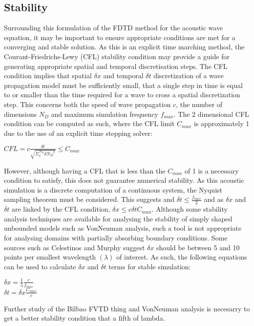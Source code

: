 \subsection{Stability}
Surrounding this formulation of the FDTD method for the acoustic wave equation, it may be important to ensure appropriate conditions are met for a converging and stable solution. As this is an explicit time marching method, the Courant-Friedrichs-Lewy (CFL) stability condition may provide a guide for generating appropriate spatial and temporal discretisation steps. The CFL condition implies that spatial $\delta x$ and temporal $\delta t$ discretization of a wave propagation model must be sufficiently small, that a single step in time is equal to or smaller than the time required for a wave to cross a spatial discretization step. This concerns both the speed of wave propagation $c$, the number of dimensions $N_D$ and maximum simulation frequency $f_{max}$. The 2 dimensional CFL condition can be computed as such, where the CFL limit $C_{max}$ is approximately 1 due to the use of an explicit time stepping solver:\\
\begin{center}
$ CFL = c \frac{\delta t}{\sqrt{\Sigma_{1}^{N_D} \delta {N_{D}}^2}} \leq C_{max}$\\
\end{center}
However, although having a CFL that is less than the $C_{max}$ of 1 is a necessary condition to satisfy, this does not guarantee numerical stability. As this acoustic simulation is a discrete computation of a continuous system, the Nyquist sampling theorem must be considered. This suggests and $\delta t \leq \frac{f_{max}}{2}$ and as $\delta x$ and $\delta t$ are linked by the CFL condition, $\delta x \leq c \delta t C_{max} $. Although some stability analysis techniques are available  for analysing the stability of simply shaped unbounded models such as VonNeuman analysis, such a tool is not appropriate for analysing domains with partially absorbing boundary conditions. Some sources such as Celestinos and Murphy suggest $\delta x$ should be between 5 and 10 points per smallest wavelength $(\lambda)$ of interest. As such, the following equations can  be used to calculate $\delta x$ and $\delta t$ terms for stable simulation:\\
\begin{center}
$\delta x = \frac{1}{5} \frac{c}{f_{max}}$\\
$\delta t = \delta x \frac{C_{max}}{c} $\\
\end{center}
Further study of the Bilbao FVTD thing and VonNeuman analysis is necesarry to get a better stability condition that a fifth of lambda.\\

